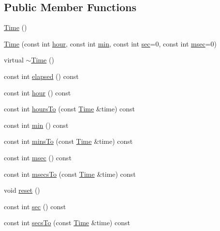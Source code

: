 \subsection*{Public Member Functions}
\begin{DoxyCompactItemize}
\item 
\hyperlink{classprism_1_1_time_a9cb33724bd39863cec83613c089d6f12}{Time} ()
\item 
\hyperlink{classprism_1_1_time_acdee4966daaf75f9b735744881481372}{Time} (const int \hyperlink{classprism_1_1_time_a380242e03982df8bf4af3eaa2296c808}{hour}, const int \hyperlink{classprism_1_1_time_afd27e4b1e093fed8253b10090c6090aa}{min}, const int \hyperlink{classprism_1_1_time_a83f655a9c7f1a2e8521ddcb395fa3796}{sec}=0, const int \hyperlink{classprism_1_1_time_a203ccb36ae3f75991b641e282350b280}{msec}=0)
\item 
virtual \hyperlink{classprism_1_1_time_a07e1c6bf7205b4451ac717a833b65968}{$\sim$\+Time} ()
\item 
const int \hyperlink{classprism_1_1_time_a786f569b1aae18249916c47d6221ae86}{elapsed} () const 
\item 
const int \hyperlink{classprism_1_1_time_a380242e03982df8bf4af3eaa2296c808}{hour} () const 
\item 
const int \hyperlink{classprism_1_1_time_a759d033f1ef8602118fbe887eb8a2241}{hours\+To} (const \hyperlink{classprism_1_1_time}{Time} \&time) const 
\item 
const int \hyperlink{classprism_1_1_time_afd27e4b1e093fed8253b10090c6090aa}{min} () const 
\item 
const int \hyperlink{classprism_1_1_time_a654fe322a9b2aefe6ec9713bebf67fc7}{mins\+To} (const \hyperlink{classprism_1_1_time}{Time} \&time) const 
\item 
const int \hyperlink{classprism_1_1_time_a203ccb36ae3f75991b641e282350b280}{msec} () const 
\item 
const int \hyperlink{classprism_1_1_time_a91a3b84fe2e96f260ce05a64d44212d6}{msecs\+To} (const \hyperlink{classprism_1_1_time}{Time} \&time) const 
\item 
void \hyperlink{classprism_1_1_time_aff00f53fdc1e7b0eb249b6410d2cde28}{reset} ()
\item 
const int \hyperlink{classprism_1_1_time_a83f655a9c7f1a2e8521ddcb395fa3796}{sec} () const 
\item 
const int \hyperlink{classprism_1_1_time_a06e59e21a308459f3984a9680e431b32}{secs\+To} (const \hyperlink{classprism_1_1_time}{Time} \&time) const 
\item 

\end{DoxyCompactItemize}
